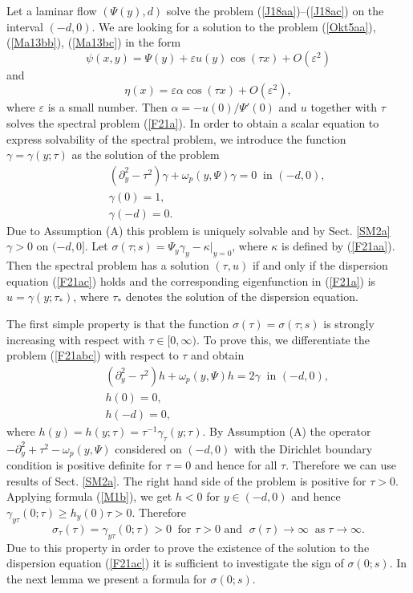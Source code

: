 \documentclass[a4paper,reqno,12pt]{amsart}
\theoremstyle{plain}
\theoremstyle{definition}
\numberwithin{equation}{section}
\begin{document}
Let a laminar flow $(\Psi(y),d)$ solve the problem (\ref{J18aa})--(\ref{J18ac}) on the interval $(-d,0)$. We are looking for a solution to the problem (\ref{Okt5aa}), (\ref{Ma13bb}), (\ref{Ma13bc}) in the form
$$
\psi(x,y)=\Psi(y)+\varepsilon u(y)\cos (\tau x)+O(\varepsilon^2)
$$
and
$$
\eta(x)=\varepsilon \alpha\cos(\tau x)+O(\varepsilon^2),
$$
where $\varepsilon$ is a small number.
Then $\alpha=-u(0)/\Psi'(0)$ and $u$ together with $\tau$ solves
the spectral problem (\ref{F21a}).
In order to obtain a scalar equation to express solvability of the spectral problem, we introduce the function $\gamma=\gamma (y;\tau)$ as the solution of the problem
\begin{eqnarray}\label{F21abc}
&&(\partial_y^2-\tau^2)\gamma+\omega_p(y,\Psi)\gamma=0\;\;\mbox{in $(-d,0)$},\nonumber\\
&&\gamma(0)=1,\nonumber\\
&& \gamma(-d)=0.
\end{eqnarray}
Due to Assumption (A) this problem is uniquely solvable and by Sect. \ref{SM2a} $\gamma>0$ on $(-d,0]$.
Let $\sigma(\tau;s)=\Psi_y\gamma_y-\kappa |_{y=0}$, where $\kappa$ is defined by (\ref{F21aa}).  Then the spectral problem has a solution $(\tau,u)$ if and only if the dispersion equation (\ref{F21ac}) holds
and the corresponding eigenfunction in (\ref{F21a}) is $u=\gamma(y;\tau_*)$, where $\tau_*$ denotes the solution of the dispersion equation.

The first simple property is that the function $\sigma(\tau)=\sigma(\tau;s)$ is strongly increasing with respect with $\tau\in [0,\infty)$. To prove this, we differentiate the problem (\ref{F21abc}) with respect to $\tau$ and obtain
\begin{eqnarray*}
&&(\partial_y^2-\tau^2)h+\omega_p(y,\Psi)h=2\gamma\;\;\mbox{in $(-d,0)$},\\
&&h(0)=0,\\
&& h(-d)=0,
\end{eqnarray*}
where $h(y)=h(y;\tau)=\tau^{-1}\gamma_\tau(y;\tau)$.
By Assumption (A) the operator $-\partial_y^2+\tau^2-\omega_p(y,\Psi)$ considered on $(-d,0)$ with the Dirichlet boundary condition is positive definite for $\tau=0$ and hence for all $\tau$. Therefore we can use results of Sect. \ref{SM2a}.
The right hand side of the problem is positive for $\tau>0$. Applying formula (\ref{M1b}), we get $h<0$ for $y\in (-d,0)$ and hence $\gamma_{y\tau}(0;\tau)\geq h_y(0)\tau >0$.
Therefore
\begin{equation}\label{F21af}
\sigma_\tau(\tau)=\gamma_{y\tau}(0;\tau)>0\;\;\mbox{for $\tau>0$ and }\;\sigma(\tau)\to\infty\;\;\mbox{as}\;\tau\to\infty.
\end{equation}
Due to this property  in order to prove the existence of the solution to the dispersion equation (\ref{F21ac}) it is sufficient to investigate the sign of $\sigma(0;s)$. In the next lemma we present a formula for $\sigma(0;s)$.
\end{document}
